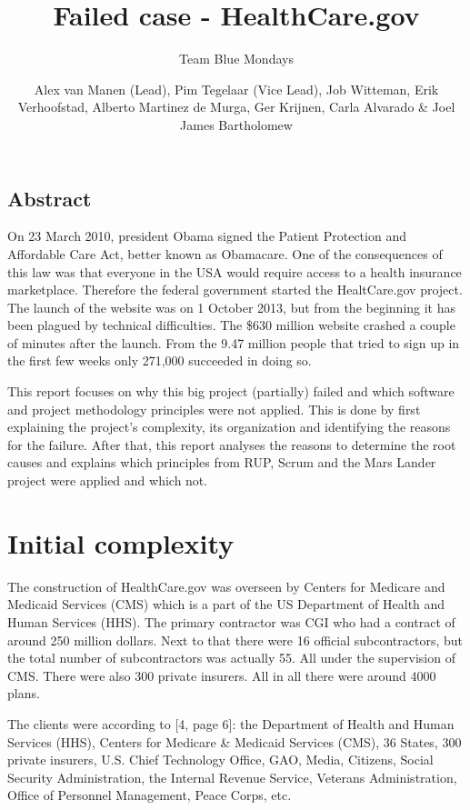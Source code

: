 \documentclass[]{article}
\title{Failed case - HealthCare.gov}
\author{Team Blue Mondays}
\date{Alex van Manen (Lead), Pim Tegelaar (Vice Lead), Job Witteman, Erik
Verhoofstad, Alberto Martinez de Murga, Ger Krijnen, Carla Alvarado \&
Joel James Bartholomew \hfill \break \break \centering{\today}}
\begin{document}
\maketitle

{
\hypersetup{linkcolor=black}
\setcounter{tocdepth}{3}
\tableofcontents
}
\newpage

\subsection{Abstract}\label{abstract}

On 23 March 2010, president Obama signed the Patient Protection and
Affordable Care Act, better known as Obamacare. One of the consequences
of this law was that everyone in the USA would require access to a
health insurance marketplace. Therefore the federal government started
the HealtCare.gov project. The launch of the website was on 1 October
2013, but from the beginning it has been plagued by technical
difficulties. The \$630 million website crashed a couple of minutes
after the launch. From the 9.47 million people that tried to sign up in
the first few weeks only 271,000 succeeded in doing so.

This report focuses on why this big project (partially) failed and which
software and project methodology principles were not applied. This is
done by first explaining the project's complexity, its organization and
identifying the reasons for the failure. After that, this report
analyses the reasons to determine the root causes and explains which
principles from RUP, Scrum and the Mars Lander project were applied and
which not.

\section{Initial complexity}\label{initial-complexity}

The construction of HealthCare.gov was overseen by Centers for Medicare
and Medicaid Services (CMS) which is a part of the US Department of
Health and Human Services (HHS). The primary contractor was CGI who had
a contract of around 250 million dollars. Next to that there were 16
official subcontractors, but the total number of subcontractors was
actually 55. All under the supervision of CMS. There were also 300
private insurers. All in all there were around 4000 plans.

The clients were according to {[}4, page 6{]}: the Department of Health
and Human Services (HHS), Centers for Medicare \& Medicaid Services
(CMS), 36 States, 300 private insurers, U.S. Chief Technology Office,
GAO, Media, Citizens, Social Security Administration, the Internal
Revenue Service, Veterans Administration, Office of Personnel
Management, Peace Corps, etc.
\end{document}
